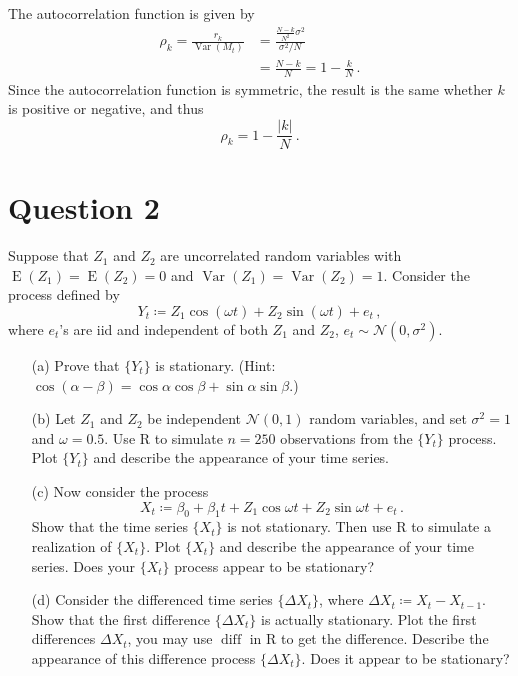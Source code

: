 \documentclass[10pt]{fphw}
\theoremstyle{definition}
\newcommand{\var}{\operatorname{Var}}
\newcommand{\expect}{\operatorname{E}}
\begin{document}
\begin{enumerate}
The autocorrelation function is given by
\begin{align}
    \rho_k = \frac{r_k}{\var(M_t)}
        &= \frac{\frac{N-k}{N^2}\sigma^2}{\sigma^2/N}\\
        &= \frac{N-k}{N} = 1 - \frac{k}{N}\,.        
\end{align}
Since the autocorrelation function is symmetric, the result is the same whether $k$ is positive or negative, and thus
\begin{equation}
    \rho_k = 1 - \frac{|k|}{N}\,.
\end{equation}
\end{enumerate}


\section*{Question 2}
\begin{problem}
Suppose that $Z_1$ and $Z_2$ are uncorrelated random variables with $\expect(Z_1) = \expect(Z_2) = 0$ and $\var(Z_1) = \var(Z_2) = 1$.
Consider the process defined by
\begin{equation}
    Y_t \coloneqq Z_1 \cos(\omega t) + Z_2 \sin(\omega t) + e_t\,,
\end{equation}
where $e_t$'s are iid and independent of both $Z_1$ and $Z_2$, $e_t \sim \mathcal{N}(0,\sigma^2)$.
\begin{enumerate}
    \item[(a)] Prove that $\{Y_t\}$ is stationary. (Hint: $\cos(\alpha - \beta) = \cos \alpha \cos \beta + \sin \alpha \sin \beta$.)
    \item[(b)] Let $Z_1$ and $Z_2$ be independent $\mathcal{N}(0, 1)$ random variables, and set $\sigma^2 = 1$ and $\omega = 0.5$.
    Use R to simulate $n = 250$ observations from the $\{Y_t\}$ process.
    Plot $\{Y_t\}$ and describe the appearance of your time series.
    \item[(c)] Now consider the process
    \begin{equation*}
        X_t \coloneqq \beta_0 + \beta_1 t + Z_1 \cos \omega t + Z_2 \sin \omega t + e_t\,.
    \end{equation*}
    Show that the time series $\{X_t\}$ is not stationary. Then use R to simulate a realization of $\{X_t\}$.
    Plot $\{X_t\}$ and describe the appearance of your time series. Does your $\{X_t\}$ process appear to be stationary?
    
    \item[(d)] Consider the differenced time series $\{\Delta X_t\}$, where $\Delta X_t \coloneqq X_t-X_{t-1}$.
    Show that the first difference $\{\Delta X_t\}$ is actually stationary. Plot the first differences $\Delta X_t$,
    you may use $\operatorname{diff}$ in R to get the difference. Describe the appearance of this difference process
    $\{\Delta X_t\}$. Does it appear to be stationary?
\end{enumerate}
\end{problem}
\end{document}

